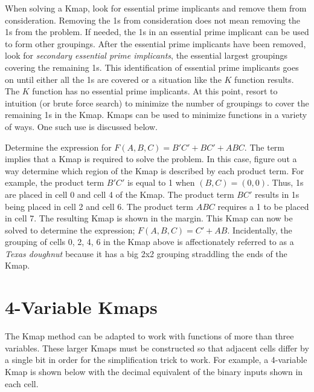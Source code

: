 When solving a Kmap, look for essential prime implicants and 
remove them from consideration.  Removing the 1s from consideration does not
mean removing the 1s from the problem.  If needed, the 1s in an essential
prime implicant can be used to form other groupings.
After the essential prime implicants 
have been removed, look for \textit{secondary essential prime implicants}, 
the essential largest groupings covering the remaining 1s.
 This identification of essential
prime implicants goes on until either all the 1s are covered or 
a situation like the $K$ function results.  The $K$ function has no 
essential prime implicants.  At this point, resort to intuition 
(or brute force search) to minimize the number of groupings
to cover the remaining 1s in the Kmap.  Kmaps can be used to 
minimize functions in a variety of ways.  One such use is discussed below.

\begin{changemargin}{1.5cm}{1.5cm}
Determine the \SOPmin expression for $F(A,B,C) = B'C' + BC' + ABC$.  The
\label{page:SymbToSymb} term \SOPmin implies that a Kmap is 
required to solve the problem. In this case, figure out a way 
determine which region of the Kmap is described by each product term.  
For example, the product term $B'C'$ is equal to 1 when $(B,C) = (0,0)$.
Thus, 1s are placed in cell 0 and cell 4 of the Kmap. The product term $BC'$
results in 1s being placed in cell 2 and cell 6.  The product term $ABC$
requires a 1 to be placed in cell 7.  The resulting Kmap is shown in the 
margin.
This Kmap can now be solved to determine the \SOPmin expression;
$F(A,B,C) = C'+AB$.  Incidentally, the grouping of cells 0, 2, 4, 6
in the Kmap above is affectionately referred to as a 
 \textit{Texas doughnut} because it has a big 2x2 
grouping straddling the ends of the Kmap.
\end{changemargin}

\section{4-Variable Kmaps}
The Kmap method can be adapted to work with functions of more than three
variables.  These larger Kmaps must be constructed so that adjacent 
cells differ by a single bit in order for the simplification trick 
to work.  For example, a 4-variable Kmap is shown below with the 
decimal equivalent of the binary inputs shown in each cell.

